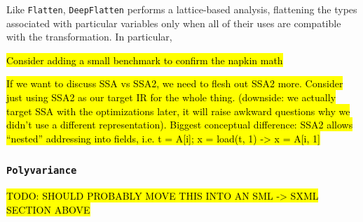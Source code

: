 \documentclass[leqno,11pt]{article}
\begin{document}
Like \texttt{Flatten}, \texttt{DeepFlatten} performs a lattice-based analysis,
flattening the types associated with particular variables only when all of their
uses are compatible with the transformation. In particular, 

\hl{Consider adding a small benchmark to confirm the napkin math}

\hl{If we want to discuss SSA vs SSA2, we need to flesh out SSA2 more. Consider
  just using SSA2 as our target IR for the whole thing. (downside: we actually
  target SSA with the optimizations later, it will raise awkward questions why
  we didn't use a different representation). Biggest conceptual difference: SSA2
  allows ``nested'' addressing into fields, i.e. t = A[i]; x = load(t, 1) -> x =
  A[i, 1]}







\subsubsection{\texttt{Polyvariance}}
\hl{TODO: SHOULD PROBABLY MOVE THIS INTO AN SML -> SXML SECTION ABOVE}
\end{document}
